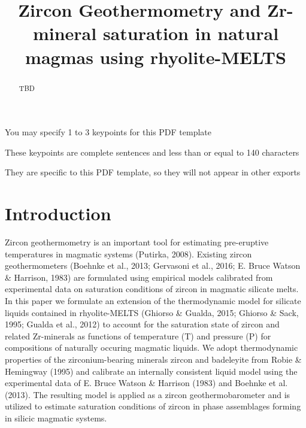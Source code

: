 \documentclass[
]{agujournal2019}
\begin{document}
\title{Zircon Geothermometry and Zr-mineral saturation in natural magmas
using rhyolite-MELTS}


\begin{keypoints}
\item You may specify 1 to 3 keypoints for this PDF template \item These
keypoints are complete sentences and less than or equal to 140
characters \item They are specific to this PDF template, so they will
not appear in other exports 
\end{keypoints}

\begin{abstract}
TBD
\end{abstract}




\section{Introduction}\label{introduction}

Zircon geothermometry is an important tool for estimating pre-eruptive
temperatures in magmatic systems (Putirka, 2008). Existing zircon
geothermometers (Boehnke et al., 2013; Gervasoni et al., 2016; E. Bruce
Watson \& Harrison, 1983) are formulated using empirical models
calibrated from experimental data on saturation conditions of zircon in
magmatic silicate melts. In this paper we formulate an extension of the
thermodynamic model for silicate liquids contained in rhyolite-MELTS
(Ghiorso \& Gualda, 2015; Ghiorso \& Sack, 1995; Gualda et al., 2012) to
account for the saturation state of zircon and related Zr-minerals as
functions of temperature (T) and pressure (P) for compositions of
naturally occuring magmatic liquids. We adopt thermodynamic properties
of the zirconium-bearing minerals zircon and badeleyite from Robie \&
Hemingway (1995) and calibrate an internally consistent liquid model
using the experimental data of E. Bruce Watson \& Harrison (1983) and
Boehnke et al. (2013). The resulting model is applied as a zircon
geothermobarometer and is utilized to estimate saturation conditions of
zircon in phase assemblages forming in silicic magmatic systems.
\end{document}
